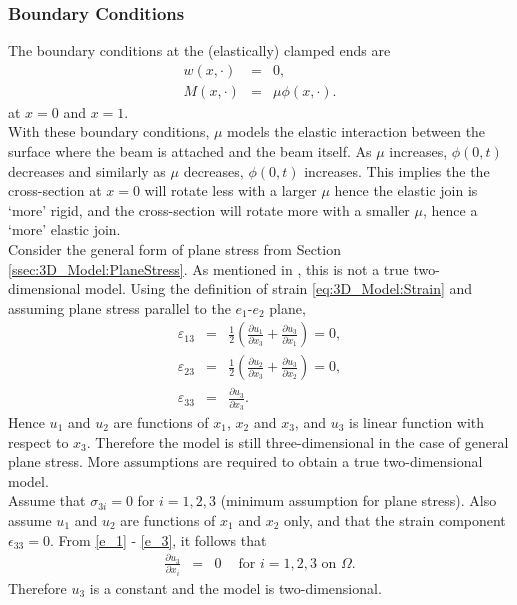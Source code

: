 \documentclass[../../main.tex]{subfiles}
\begin{document}
\subsubsection{Boundary Conditions}
\noindent
The boundary conditions at the (elastically) clamped ends are
\begin{eqnarray}
   w(x,\cdot) &=&  0, \label{CT_5}\\
   M(x,\cdot) &=&  \mu \phi(x,\cdot). \label{CT_6}
\end{eqnarray} at $x = 0$ and $x = 1$.\\

With these boundary conditions, $\mu$ models the elastic interaction between the surface where the beam is attached and the beam itself. As $\mu$ increases, $\phi(0,t)$ decreases and similarly as $\mu$ decreases, $\phi(0,t)$ increases. This implies the the cross-section at $x=0$ will rotate less with a larger $\mu$ hence the elastic join is `more' rigid, and the cross-section will rotate more with a smaller $\mu$, hence a `more' elastic join.\\

Consider the general form of plane stress from Section \ref{ssec:3D_Model:PlaneStress}. As mentioned in \cite{Fung65}, this is not a true two-dimensional model. Using the definition of strain \eqref{eq:3D_Model:Strain} and assuming plane stress parallel to the $e_1$-$e_2$ plane,
\begin{eqnarray}
	\varepsilon_{13} &=&  \frac{1}{2}\left( \frac{\partial u_1}{\partial x_3} + \frac{\partial u_3}{\partial x_1} \right) = 0,\label{e_1}\\
	\varepsilon_{23} &=& \frac{1}{2}\left( \frac{\partial u_2}{\partial x_3} + \frac{\partial u_3}{\partial x_2} \right) = 0,\label{e_2}\\
	\varepsilon_{33} &=& \frac{\partial u_3}{\partial x_3}.\label{e_3}
\end{eqnarray}
Hence $u_1$ and $u_2$ are functions of $x_1$, $x_2$ and $x_3$, and $u_3$ is linear function with respect to $x_3$. Therefore the model is still three-dimensional in the case of general plane stress. More assumptions are required to obtain a true two-dimensional model.\\

Assume that $\sigma_{3i} = 0$ for $i = 1,2,3$ (minimum assumption for plane stress). Also assume $u_1$ and $u_2$ are functions of $x_1$ and $x_2$ only, and that the strain component $\epsilon_{33} = 0$. From \eqref{e_1} - \eqref{e_3}, it follows that
\begin{eqnarray*}
	\frac{\partial u_3}{\partial x_i} & = & 0  \ \ \ \ \textrm{ for } i = 1,2,3 \textrm{ on } \Omega.
\end{eqnarray*} 
Therefore $u_3$ is a constant and the model is two-dimensional.
\end{document}
